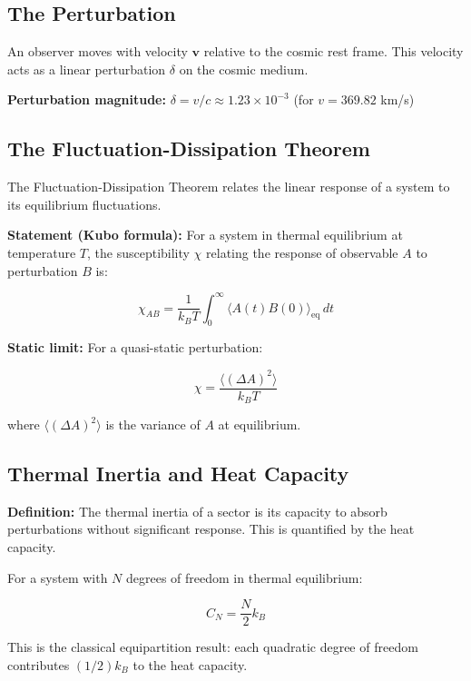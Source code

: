 \documentclass[12pt,a4paper]{article}
\begin{document}
\subsection{The Perturbation}

An observer moves with velocity $\mathbf{v}$ relative to the cosmic rest frame. This velocity acts as a linear perturbation $\delta$ on the cosmic medium.

\textbf{Perturbation magnitude:} $\delta = v/c \approx 1.23 \times 10^{-3}$ (for $v = 369.82$ km/s)

\subsection{The Fluctuation-Dissipation Theorem}

The Fluctuation-Dissipation Theorem relates the linear response of a system to its equilibrium fluctuations.

\textbf{Statement (Kubo formula):} For a system in thermal equilibrium at temperature $T$, the susceptibility $\chi$ relating the response of observable $A$ to perturbation $B$ is:

\begin{equation}
\chi_{AB} = \frac{1}{k_B T} \int_0^\infty \langle A(t) B(0) \rangle_{\text{eq}} \, dt
\end{equation}

\textbf{Static limit:} For a quasi-static perturbation:

\begin{equation}
\chi = \frac{\langle (\Delta A)^2 \rangle}{k_B T}
\end{equation}

where $\langle(\Delta A)^2\rangle$ is the variance of $A$ at equilibrium.

\subsection{Thermal Inertia and Heat Capacity}

\textbf{Definition:} The thermal inertia of a sector is its capacity to absorb perturbations without significant response. This is quantified by the heat capacity.

For a system with $N$ degrees of freedom in thermal equilibrium:

\begin{equation}
C_N = \frac{N}{2} k_B
\end{equation}

This is the classical equipartition result: each quadratic degree of freedom contributes $(1/2)k_B$ to the heat capacity.
\end{document}
